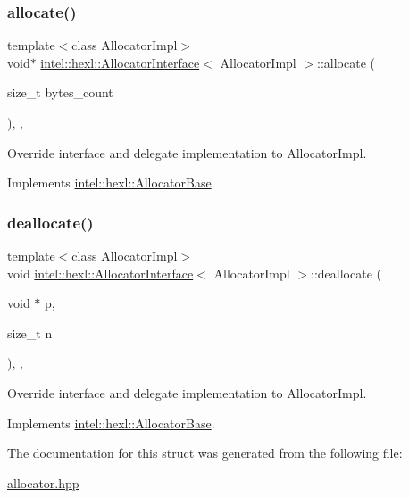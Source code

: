 \subsubsection{\texorpdfstring{allocate()}{allocate()}}
{\footnotesize\ttfamily template$<$class Allocator\+Impl$>$ \\
void$\ast$ \hyperlink{structintel_1_1hexl_1_1AllocatorInterface}{intel\+::hexl\+::\+Allocator\+Interface}$<$ Allocator\+Impl $>$\+::allocate (\begin{DoxyParamCaption}\item[{size\+\_\+t}]{bytes\+\_\+count }\end{DoxyParamCaption})\hspace{0.3cm}{\ttfamily [inline]}, {\ttfamily [override]}, {\ttfamily [virtual]}}



Override interface and delegate implementation to Allocator\+Impl. 



Implements \hyperlink{structintel_1_1hexl_1_1AllocatorBase_aadf587e7617fbace2e9d3b4f9d9e8af0}{intel\+::hexl\+::\+Allocator\+Base}.

\mbox{\label{structintel_1_1hexl_1_1AllocatorInterface_a2684feec3b8f3cfba626b46912b4cec5}} 
\subsubsection{\texorpdfstring{deallocate()}{deallocate()}}
{\footnotesize\ttfamily template$<$class Allocator\+Impl$>$ \\
void \hyperlink{structintel_1_1hexl_1_1AllocatorInterface}{intel\+::hexl\+::\+Allocator\+Interface}$<$ Allocator\+Impl $>$\+::deallocate (\begin{DoxyParamCaption}\item[{void $\ast$}]{p,  }\item[{size\+\_\+t}]{n }\end{DoxyParamCaption})\hspace{0.3cm}{\ttfamily [inline]}, {\ttfamily [override]}, {\ttfamily [virtual]}}



Override interface and delegate implementation to Allocator\+Impl. 



Implements \hyperlink{structintel_1_1hexl_1_1AllocatorBase_a0f03686f9b78728d4d228ceaf4c2948e}{intel\+::hexl\+::\+Allocator\+Base}.



The documentation for this struct was generated from the following file\+:\begin{DoxyCompactItemize}
\item 
\hyperlink{allocator_8hpp}{allocator.\+hpp}\end{DoxyCompactItemize}

